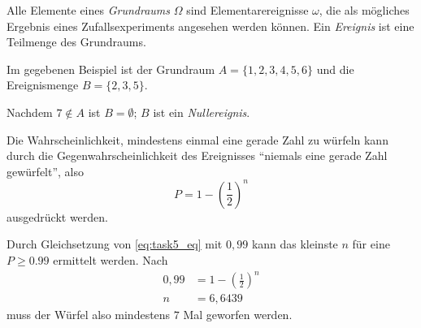 \documentclass[a4paper]{article}
\begin{document}
\begin{tasks}
    \item Alle Elemente eines \emph{Grundraums} $\Omega$ sind Elementarereignisse $\omega$, die als mögliches Ergebnis eines Zufallsexperiments angesehen werden können. Ein \emph{Ereignis} ist eine Teilmenge des Grundraums.

    Im gegebenen Beispiel ist der Grundraum $A = \{1, 2, 3, 4, 5, 6\}$ und die Ereignismenge $B = \{2, 3, 5\}$.

    Nachdem $7 \not\in A$ ist $B = \emptyset$; $B$ ist ein \emph{Nullereignis}.

    \item Die Wahrscheinlichkeit, mindestens einmal eine gerade Zahl zu würfeln kann durch die Gegenwahrscheinlichkeit des Ereignisses \enquote{niemals eine gerade Zahl gewürfelt}, also
    \begin{equation}\label{eq:task5_eq}
        P = 1 - \left( \frac{1}{2} \right)^n
    \end{equation}
    ausgedrückt werden.

    Durch Gleichsetzung von \eqref{eq:task5_eq} mit $0,99$ kann das kleinste $n$ für eine $P \geq 0.99$ ermittelt werden. Nach
    \begin{align*}
        0,99 &= 1 - \left( \frac{1}{2} \right) ^n\\
        n &= 6,6439
    \end{align*}
    muss der Würfel also mindestens $7$ Mal geworfen werden.

\end{tasks}
\end{document}
